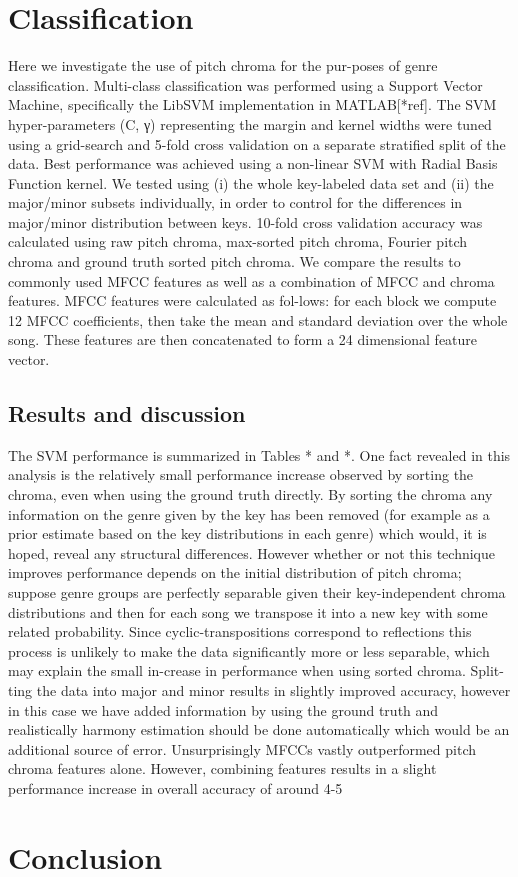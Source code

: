 \documentclass{article}
\begin{document}
\section{Classification}
Here we investigate the use of pitch chroma for the pur-poses of genre classification. Multi-class classification was performed using a Support Vector Machine, specifically the LibSVM implementation in MATLAB[*ref]. The SVM hyper-parameters (C, γ) representing the margin and kernel widths were tuned using a grid-search and 5-fold cross validation on a separate stratified split of the data. Best performance was achieved using a non-linear SVM with Radial Basis Function kernel.	                 	We tested using (i) the whole key-labeled data set and (ii) the major/minor subsets individually, in order to control for the differences in major/minor distribution between keys. 10-fold cross validation  accuracy was calculated using raw pitch chroma, max-sorted pitch  chroma, Fourier pitch chroma and ground truth sorted pitch chroma. We compare the results to commonly used MFCC features as well as a combination of MFCC and chroma features. MFCC features were calculated as fol-lows: for each block we compute 12 MFCC coefficients, then take the mean and standard deviation over the whole song. These features are then concatenated to form a 24 dimensional feature vector.

\subsection{Results and discussion}
The SVM performance is summarized in Tables * and *. One fact revealed in this analysis is the relatively small performance increase observed by sorting the chroma, even when using the ground truth directly. By sorting the chroma any information on the genre given by the key has been removed (for example as a prior estimate based on the key distributions in each genre) which would, it is hoped, reveal any structural differences. However whether or not this technique improves performance depends on the initial distribution of pitch chroma; suppose genre groups are perfectly separable given their key-independent chroma distributions and then for each song we transpose it into a new key with some related probability. Since cyclic-transpositions correspond to reflections this process is unlikely to make the data significantly more or less separable, which may explain the small in-crease in performance when using sorted chroma. Split-ting the data into major and minor results in slightly improved accuracy, however in this case we have added information by using the ground truth and realistically harmony estimation should be done automatically which would be an additional source of error.
	Unsurprisingly MFCCs vastly outperformed pitch chroma features alone. However, combining features results in a slight performance increase in overall accuracy of around 4-5%

\section{Conclusion}



\end{document}

